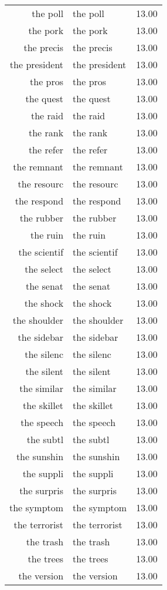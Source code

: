 \begin{table}[ht]
\begin{tabular}{rlr}
  the poll & the poll & 13.00 \\ 
  the pork & the pork & 13.00 \\ 
  the precis & the precis & 13.00 \\ 
  the president & the president & 13.00 \\ 
  the pros & the pros & 13.00 \\ 
  the quest & the quest & 13.00 \\ 
  the raid & the raid & 13.00 \\ 
  the rank & the rank & 13.00 \\ 
  the refer & the refer & 13.00 \\ 
  the remnant & the remnant & 13.00 \\ 
  the resourc & the resourc & 13.00 \\ 
  the respond & the respond & 13.00 \\ 
  the rubber & the rubber & 13.00 \\ 
  the ruin & the ruin & 13.00 \\ 
  the scientif & the scientif & 13.00 \\ 
  the select & the select & 13.00 \\ 
  the senat & the senat & 13.00 \\ 
  the shock & the shock & 13.00 \\ 
  the shoulder & the shoulder & 13.00 \\ 
  the sidebar & the sidebar & 13.00 \\ 
  the silenc & the silenc & 13.00 \\ 
  the silent & the silent & 13.00 \\ 
  the similar & the similar & 13.00 \\ 
  the skillet & the skillet & 13.00 \\ 
  the speech & the speech & 13.00 \\ 
  the subtl & the subtl & 13.00 \\ 
  the sunshin & the sunshin & 13.00 \\ 
  the suppli & the suppli & 13.00 \\ 
  the surpris & the surpris & 13.00 \\ 
  the symptom & the symptom & 13.00 \\ 
  the terrorist & the terrorist & 13.00 \\ 
  the trash & the trash & 13.00 \\ 
  the trees & the trees & 13.00 \\ 
  the version & the version & 13.00 \\ 

\end{tabular}
\end{table}
